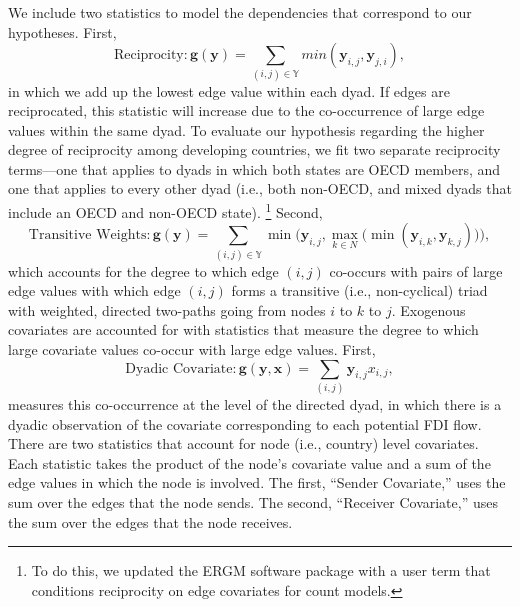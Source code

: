 \documentclass[reqno,onecolumn,letterpaper,12pt]{article}
\begin{document}
We include two statistics to model the dependencies that correspond to our hypotheses. First,
$$ \text{Reciprocity}: \bm{g(y)} = \sum_{(i,j) {\in} \mathbb{Y}}min(\bm{y}_{i,j},\bm{y}_{j,i}),$$ in which we add up the lowest edge value within each dyad. If edges are reciprocated, this statistic will increase due to the co-occurrence of large edge values within the same dyad. To evaluate our hypothesis regarding the higher degree of reciprocity among developing countries, we fit two separate reciprocity terms---one that applies to dyads in which both states are OECD members, and one that applies to every other dyad (i.e., both non-OECD, and mixed dyads that include an OECD and non-OECD state). \footnote{To do this, we updated the ERGM software package with a user term that conditions reciprocity on edge covariates for count models.} Second,
$$\text{Transitive Weights}: \bm{g(y)} =  \sum_{(i,j) {\in} \mathbb{Y}}\min\bigg( \bm{y}_{i,j}, \max\limits_{k{\in}N}\Big(\min(\bm{y}_{i,k},\bm{y}_{k,j})\Big) \bigg),$$ which accounts for the degree to which edge $(i,j)$ co-occurs with pairs of large edge values with which edge $(i,j)$ forms a transitive (i.e., non-cyclical) triad with weighted, directed two-paths going from nodes $i$ to $k$ to $j$. Exogenous covariates are accounted for with statistics that measure the degree to which large covariate values co-occur with large edge values. First,
$$ \text{Dyadic Covariate}: \bm{g(y,x)} = \sum_{(i,j)} \bm{y}_{i,j}x_{i,j},$$ measures this co-occurrence at the level of the directed dyad, in which there is a dyadic observation of the covariate corresponding to each potential FDI flow. There are two statistics that account for node (i.e., country) level covariates. Each statistic takes the product of the node's covariate value and a sum of the edge values in which the node is involved. The first, ``Sender Covariate,'' uses the sum over the edges that the node sends. The second, ``Receiver Covariate,'' uses the sum over the edges that the node receives.


\end{document}
